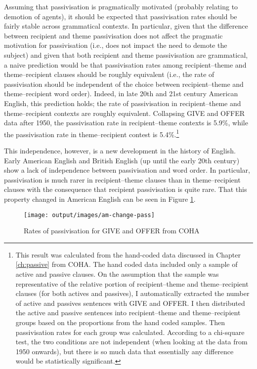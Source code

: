 	Assuming that passivisation is pragmatically motivated (probably relating to demotion of agents), it should be expected that passivisation rates should be fairly stable across grammatical contexts. In particular, given that the difference between recipient and theme passivisation does not affect the pragmatic motivation for passivisation (i.e., does not impact the need to demote the subject) and given that both recipient and theme passivisation are grammatical, a naive prediction would be that passivisation rates among recipient--theme and theme--recipient clauses should be roughly equivalent (i.e., the rate of passivisation should be independent of the choice between recipient--theme and theme--recipient word order). Indeed, in late 20th and 21st century American English, this prediction holds; the rate of passivisation in recipient--theme and theme--recipient contexts are roughly equivalent. Collapsing GIVE and OFFER data after 1950, the passivisation rate in recipient--theme contexts is 5.9\%, while the passivisation rate in theme--recipient contest is 5.4\%.\footnote{This result was calculated from the hand-coded data discussed in Chapter \ref{ch:passive} from COHA. The hand coded data included only a sample of active and passive clauses. On the assumption that the sample was representative of the relative portion of recipient--theme and theme--recipient clauses (for both actives and passives), I automatically extracted the number of active and passives sentences with GIVE and OFFER. I then distributed the active and passive sentences into recipient--theme and theme--recipient groups based on the proportions from the hand coded samples. Then passivisation rates for each group was calculated. According to a chi-square test, the two conditions are not independent (when looking at the data from 1950 onwards), but there is so much data that essentially any difference would be statistically significant.}
	
	This independence, however, is a new development in the history of English. Early American English and British English (up until the early 20th century) show a lack of independence between passivisation and word order. In particular, passivisation is much rarer in recipient--theme clauses than in theme--recipient clauses with the consequence that recipient passivisation is quite rare. That this property changed in American English can be seen in Figure \ref{fig:am-change-pass}.


	\begin{figure}[ht!]
		\texttt{[image: output/images/am-change-pass]}
		\caption{Rates of passivisation for GIVE and OFFER from COHA}
		\label{fig:am-change-pass}
	\end{figure}

